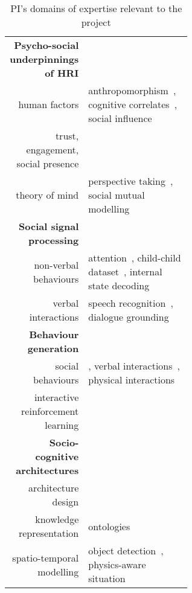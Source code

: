 \begin{table}[h]
    \centering
    \caption{\small PI's domains of expertise relevant to the \project project}
    \begin{tabular}{rp{0.6\linewidth}}
        \toprule
        \textbf{Psycho-social underpinnings of HRI} \\  
        human factors & \small anthropomorphism~\cite{lemaignan2014dynamics}, cognitive
        correlates~\cite{lemaignan2014cognitive}, social influence~\cite{winkle2019effective} \\
        trust, engagement, social presence & \small \cite{flook2019impact,lemaignan2015youre,fink2014which,irfan2018social} \\
        theory of mind & \small perspective taking~\cite{ros2010which, warnier2012when}, social mutual modelling~\cite{lemaignan2015mutual,dillenbourg2016symmetry} \\
        \midrule
        \textbf{Social signal processing}\\
        non-verbal behaviours & \small attention~\cite{lemaignan2016realtime},
        child-child dataset~\cite{lemaignan2018pinsoro}, internal state decoding~\cite{bartlett2019what} \\
        verbal interactions & \small speech recognition~\cite{kennedy2017child}, dialogue grounding~\cite{lemaignan2011grounding} \\
        \midrule
        \textbf{Behaviour generation} \\
        social behaviours & \small \cite{lallee2011towards}, verbal interactions~\cite{wallbridge2019generating, wallbridge2019towards}, physical interactions~\cite{gharbi2013natural} \\
        interactive reinforcement learning & \small \cite{senft2017leveraging,senft2017supervised, senft2019teaching} \\
        \midrule
        \textbf{Socio-cognitive architectures} \\
        architecture design & \small \cite{lemaignan2017artificial, baxter2016cognitive,lemaignan2014challenges,lallee2012towards, mallet2010genom3} \\
        knowledge representation & \small
        ontologies~\cite{lemaignan2010oro, lemaignan2013explicit} \\    
        spatio-temporal modelling & \small object
        detection~\cite{wallbridge2017qualitative}, physics-aware situation

\end{tabular}
\end{table}
